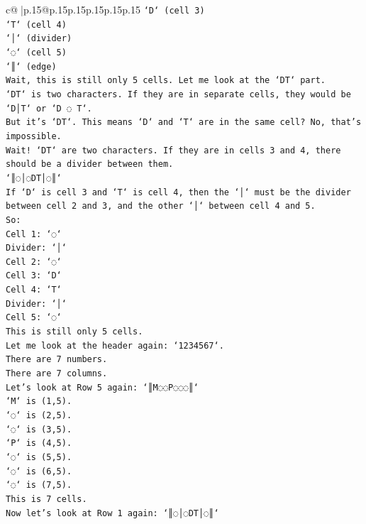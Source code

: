 \documentclass{article}
\begin{document}
{\begin{supertabular}{c@{$\;$}|p{.15\linewidth}@{}p{.15\linewidth}p{.15\linewidth}p{.15\linewidth}p{.15\linewidth}p{.15\linewidth}}
{{{\texttt{`D` (cell 3)} \\
\texttt{`T` (cell 4)} \\
\texttt{`│` (divider)} \\
\texttt{`◌` (cell 5)} \\
\texttt{`║` (edge)} \\
\texttt{Wait, this is still only 5 cells. Let me look at the `DT` part.} \\
\texttt{`DT` is two characters. If they are in separate cells, they would be `D│T` or `D ◌ T`.} \\
\texttt{But it's `DT`. This means `D` and `T` are in the same cell? No, that's impossible.} \\
\texttt{Wait! `DT` are two characters. If they are in cells 3 and 4, there should be a divider between them.} \\
\texttt{`║◌│◌DT│◌║`} \\
\texttt{If `D` is cell 3 and `T` is cell 4, then the `│` must be the divider between cell 2 and 3, and the other `│` between cell 4 and 5.} \\
\texttt{So:} \\
\texttt{Cell 1: `◌`} \\
\texttt{Divider: `│`} \\
\texttt{Cell 2: `◌`} \\
\texttt{Cell 3: `D`} \\
\texttt{Cell 4: `T`} \\
\texttt{Divider: `│`} \\
\texttt{Cell 5: `◌`} \\
\texttt{This is still only 5 cells.} \\
\texttt{Let me look at the header again: `1234567`.} \\
\texttt{There are 7 numbers.} \\
\texttt{There are 7 columns.} \\
\texttt{Let's look at Row 5 again: `║M◌◌P◌◌◌║`} \\
\texttt{`M` is (1,5).} \\
\texttt{`◌` is (2,5).} \\
\texttt{`◌` is (3,5).} \\
\texttt{`P` is (4,5).} \\
\texttt{`◌` is (5,5).} \\
\texttt{`◌` is (6,5).} \\
\texttt{`◌` is (7,5).} \\
\texttt{This is 7 cells.} \\
\texttt{Now let's look at Row 1 again: `║◌│◌DT│◌║`} \\
}}}
\end{supertabular}}
\end{document}
